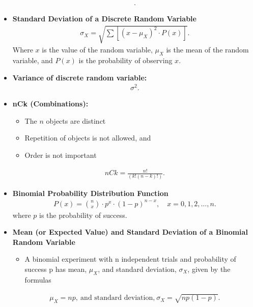 \documentclass{report}
\begin{document}
\begin{itemize}
\begin{align*}
            .\end{align*}
        \item \textbf{Standard Deviation of a Discrete Random Variable}
            \begin{align*}
                \sigma_X = \sqrt{\sum [(x - \mu_X)^2 \cdot P(x)]}
            .\end{align*}
        Where $x$ is the value of the random variable, $\mu_X$ is the mean of the random variable, and $P(x)$ is the probability of observing $x$.
        \item \textbf{Variance of discrete random variable:}
            \begin{align*}
                \sigma^{2}
            .\end{align*}
          \item \textbf{nCk (Combinations):}
              \begin{itemize}
                  \item The  $n$  objects are distinct
                  \item Repetition of objects is not allowed, and
                  \item Order is not important
              \end{itemize}
              \begin{align*}
                  nCk = \frac{n!}{(k!(n-k)!)}
              .\end{align*}
            \item \textbf{Binomial Probability Distribution Function}
                \begin{align*}
                    P(x) = \binom{n}{x} \cdot p^x \cdot (1 - p)^{n-x}, \quad x = 0, 1, 2, \ldots, n
                .\end{align*}
                where $p$ is the probability of success.
            \item \textbf{Mean (or Expected Value) and Standard Deviation of a Binomial Random Variable}
                \begin{itemize}
                    \item A binomial experiment with n independent trials and probability of success p has mean, $\mu_X$, and standard deviation, $\sigma_X$, given by the formulas
                \end{itemize}
                \begin{align*}
                    \mu_X = np,\ \text{and standard deviation,}\ \sigma_X = \sqrt{np(1-p)}
                .\end{align*}

\end{itemize}
\end{document}
